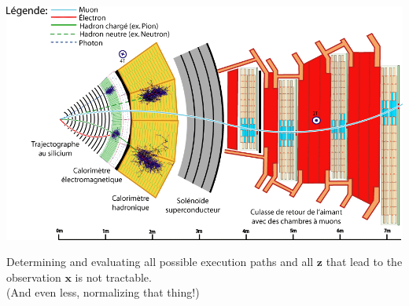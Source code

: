 \documentclass{beamer}
\newcommand{\bfx}{\mathbf{x}}
\newcommand{\bfz}{\mathbf{z}}
\begin{document}
\begin{frame}
    \begin{center}
        \includegraphics[width=\textwidth]{figures/cms.png}

        \vspace{0.5cm}

        Determining and evaluating all possible execution paths and all $\bfz$ that lead to the observation $\bfx$ is not tractable.\\

        {\scriptsize (And even less, normalizing that thing!)}
    \end{center}
\end{frame}
\end{document}
